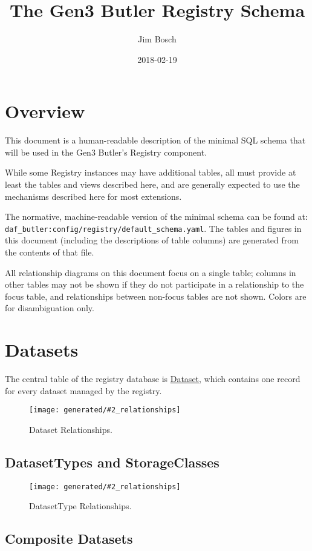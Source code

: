 \documentclass[DM,toc]{lsstdoc}
\title{The Gen3 Butler Registry Schema}
\author{Jim Bosch}
\date{2018-02-19}
\newcommand{\tblref}[1]{\hyperref[tbl:#1]{#1}}
\newcommand{\coltable}[1]{
    \begin{table}
        {\footnotesize
        }
        \caption{#1 Columns}
        \label{tbl:#1}
    \end{table}
}
\newcommand{\relgraph}[2][width=0.8\textwidth]{
    \begin{figure}
        \centering
        \texttt{[image: generated/\#2\_relationships]}
        \caption{#2 Relationships.}
        \label{rel:#2}
    \end{figure}
}
\begin{document}
\maketitle

\section{Overview}
\label{sec:overview}

This document is a human-readable description of the minimal SQL schema that will be used in the Gen3 Butler's Registry component.

While some Registry instances may have additional tables, all must provide at least the tables and views described here, and are generally expected to use the mechanisms described here for most extensions.

The normative, machine-readable version of the minimal schema can be found at: \verb`daf_butler:config/registry/default_schema.yaml`.
The tables and figures in this document (including the descriptions of table columns) are generated from the contents of that file.

All relationship diagrams on this document focus on a single table; columns in other tables may not be shown if they do not participate in a relationship to the focus table, and relationships between non-focus tables are not shown.  Colors are for disambiguation only.

\section{Datasets}
\label{sec:datasets}

The central table of the registry database is \tblref{Dataset}, which contains one record for every dataset managed by the registry.

\coltable{Dataset}
\relgraph[height=0.8\textheight]{Dataset}

\subsection{DatasetTypes and StorageClasses}
\label{sec:datasettypes-and-storageclasses}

\coltable{DatasetType}
\relgraph{DatasetType}

\coltable{DatasetTypeUnits}
\coltable{DatasetTypeMetadata}

\subsection{Composite Datasets}
\label{sec:composite-datasets}
\end{document}
